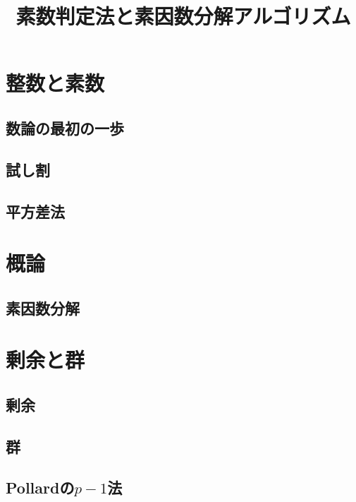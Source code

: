 
\title{素数判定法と素因数分解アルゴリズム}
\author{}
\date{}
\makeindex

\setcounter{notesNum}{1}
\maketitle
\begin{multicols}{2}
\setcounter{tocdepth}{3}
\tableofcontents
\end{multicols}
\newpage

\section{整数と素数}
\subsection{数論の最初の一歩}

\subsection{試し割}

\subsection{平方差法}


\section{概論}
\subsection{素因数分解}


\section{剰余と群}
\subsection{剰余}

\subsection{群}

\subsection{Pollardの$p-1$法}

